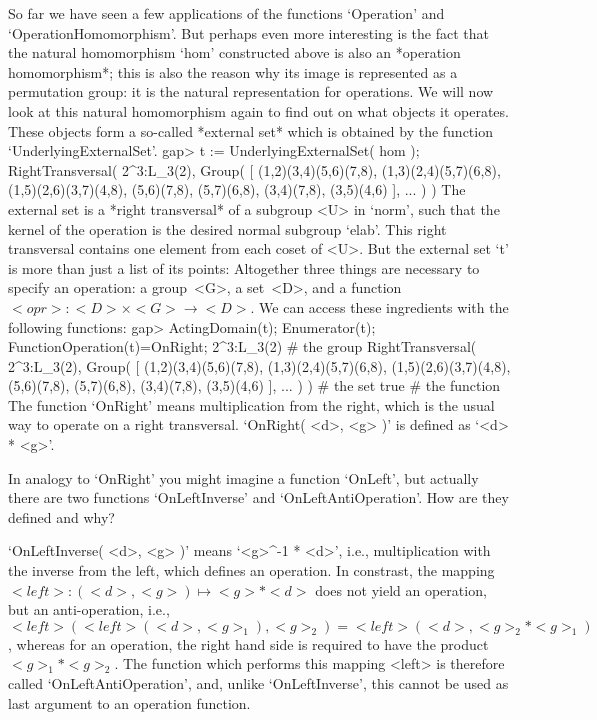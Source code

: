 So far we  have seen a few  applications of the functions `Operation' and
`OperationHomomorphism'. But perhaps   even more interesting is the  fact
that  the   natural homomorphism  `hom'   constructed  above is   also an
*operation homomorphism*;  this  is  also the  reason   why its  image is
represented as a permutation group: it is  the natural representation for
operations. We will now look  at this natural  homomorphism again to find
out on what objects it operates. These objects form a so-called *external
set* which is obtained by the function `UnderlyingExternalSet'.
\beginexample
    gap> t := UnderlyingExternalSet( hom );
    RightTransversal( 2^3:L_3(2), Group( 
    [ (1,2)(3,4)(5,6)(7,8), (1,3)(2,4)(5,7)(6,8), (1,5)(2,6)(3,7)(4,8), 
      (5,6)(7,8), (5,7)(6,8), (3,4)(7,8), (3,5)(4,6) ], ... ) )
\endexample
{}%
The external  set is a  *right transversal* of a  subgroup <U> in `norm',
such that  the  kernel of the operation  is  the desired normal  subgroup
`elab'. This right  transversal contains one  element from each coset  of
<U>. But  the external set `t' is  more than just a  list  of its points:
Altogether  three  things are   necessary  to  specify an   operation:  a
group~<G>, a set~<D>, and a function  $<opr>\colon <D>\times <G>\to <D>$.
We can access these ingredients with the following functions:
\beginexample
    gap> ActingDomain(t); Enumerator(t); FunctionOperation(t)=OnRight;
    2^3:L_3(2)  # the group
    RightTransversal( 2^3:L_3(2), Group( 
    [ (1,2)(3,4)(5,6)(7,8), (1,3)(2,4)(5,7)(6,8), (1,5)(2,6)(3,7)(4,8), 
      (5,6)(7,8), (5,7)(6,8), (3,4)(7,8), (3,5)(4,6) ], ... ) )  # the set
    true  # the function
\endexample
The function `OnRight' means multiplication from the  right, which is the
usual way to  operate on a right transversal.  `OnRight(  <d>, <g> )'  is
defined as `<d> * <g>'.

\exercise In analogy to `OnRight'  you might imagine a function `OnLeft',
but  actually  there      are   two   functions     `OnLeftInverse'   and
`OnLeftAntiOperation'. How are they defined and why?

\answer   `OnLeftInverse(  <d>,  <g>  )'  means   `<g>^-1 *  <d>',  i.e.,
multiplication  with the  inverse   from   the  left, which defines    an
operation. In constrast,  the mapping $<left>\colon (<d>,<g>) \mapsto <g>
* <d>$ does not yield an operation, but an anti-operation, i.e., $<left>(
<left>( <d>,  <g>_1 ), <g>_2  ) = <left>( <d>, <g>_2  * <g>_1 )$, whereas
for an  operation, the  right hand side  is required  to have the product
$<g>_1 * <g>_2$.  The {\GAP} function which  performs this mapping <left>
is therefore called  `OnLeftAntiOperation', and, unlike  `OnLeftInverse',
this cannot be used as last argument to an operation function.

